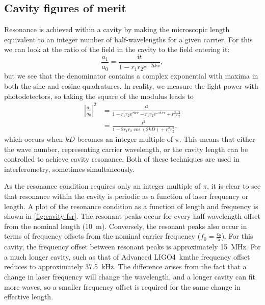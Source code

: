 \subsection{\label{sec:cavity-fom}Cavity figures of merit}
Resonance is achieved within a \FP{} cavity by making the microscopic length equivalent to an integer number of half-wavelengths for a given carrier. For this we can look at the ratio of the field in the cavity to the field entering it:
\begin{equation}
  \frac{a_1}{a_0} = \frac{\text{i} t}{1 - r_1 r_2 \text{e}^{-2\text{i}kx}},
\end{equation}
but we see that the denominator contains a complex exponential with maxima in both the sine and cosine quadratures. In reality, we measure the light power with photodetectors, so taking the square of the modulus leads to
\begin{equation}
  \begin{split}
    \left|\frac{a_1}{a_0}\right|^2 &= \frac{t^2}{1-r_1 r_2 \text{e}^{2\text{i}kx} - r_1 r_2 \text{e}^{-2\text{i}kx} + r_1^2 r_2^2} \\
                                   &= \frac{t^2}{1 - 2 r_1 r_2 \cos{\left( 2kD \right)} + r_1^2 r_2^2},
  \end{split}
\end{equation}
which occurs when $kD$ becomes an integer multiple of $\pi$. This means that either the wave number, representing carrier wavelength, or the cavity length can be controlled to achieve cavity resonance. Both of these techniques are used in interferometry, sometimes simultaneously.

As the resonance condition requires only an integer multiple of $\pi$, it is clear to see that resonance within the cavity is periodic as a function of laser frequency or length. A plot of the resonance condition as a function of length and frequency is shown in \cref{fig:cavity-fsr}. The resonant peaks occur for every half wavelength offset from the nominal length (\SI{10}{\meter}). Conversely, the resonant peaks also occur in terms of frequency offsets from the nominal carrier frequency ($f_0 = \frac{c_0}{\lambda}$). For this cavity, the frequency offset between resonant peaks is approximately \SI{15}{\mega\hertz}. For a much longer cavity, such as that of Advanced LIGO\textemdash \SI{4}{\kilo\meter}\textemdash the frequency offset reduces to approximately \SI{37.5}{\kilo\hertz}. The difference arises from the fact that a change in laser frequency will change the wavelength, and a longer cavity can fit more waves, so a smaller frequency offset is required for the same change in effective length.

